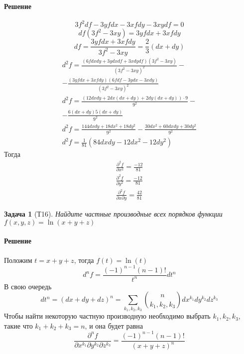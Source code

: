 \documentclass[a4paper,12pt]{report}
\newtheorem{problem}{Задача}[]
\newenvironment{sol}{\paragraph{Решение}}{}
\begin{document}
    \begin{sol}
        \begin{equation*}
            3f^2df-3yfdx-3xfdy-3xydf=0
        \end{equation*}
        \begin{equation*}
            df(3f^2-3xy)=3yfdx+3xfdy
        \end{equation*}
        \begin{equation*}
            df=\frac{3yfdx+3xfdy}{3f^2-3xy}=\frac{2}{3}(dx+dy)
        \end{equation*}
        \begin{eqnarray*}
            d^2f=\frac{(6fdxdy+3ydxdf+3xdydf)(3f^2-3xy)}{(3f^2-3xy)^2}-\\-\frac{(3yfdx+3xfdy)(6fdf-3ydx-3xdy)}{(3f^2-3xy)^2}\\ 
            d^2f=\frac{(12dxdy+2dx(dx+dy)+2dy(dx+dy))\cdot9}{9^2}-\\ 
            -\frac{6(dx+dy){5(dx+dy)}}{9^2}\\ 
            d^2f=\frac{144dxdy+18dx^2+18dy^2}{9^2}-\frac{30dx^2+60dxdy+30dy^2}{9^2}\\ 
            d^2f=\frac{1}{81}(84dxdy-12dx^2-12dy^2)
        \end{eqnarray*}
        Тогда
        \begin{eqnarray}
            \frac{\partial^2f}{\partial x^2}=\frac{-12}{81}\\ 
            \frac{\partial^2f}{\partial y^2}=\frac{-12}{81}\\ 
            \frac{\partial^2f}{\partial x\partial y}=\frac{42}{81}
        \end{eqnarray}
    \end{sol}


    \begin{problem}[Т16]
        Найдите частные производные всех порядков функции $f(x,y,z)=\ln{(x+y+z)}$
    \end{problem}
    \begin{sol}
        Положим $t=x+y+z$, тогда $f(t)=\ln(t)$
        \begin{equation}
            d^nf=\frac{(-1)^{n-1}(n-1)!}{t^n}dt^n
        \end{equation}
        В свою очередь 
        \begin{equation}
            dt^n=(dx+dy+dz)^n=\displaystyle\sum_{k_1,k_2,k_3}^{}{n\choose k_1,k_2,k_3}dx^{k_1}dy^{k_2}dz^{k_3}
        \end{equation}
        Чтобы найти некоторую частную производную необходимо выбрать $k_1,k_2,k_3$, такие что $k_1+k_2+k_3=n$, и она будет равна
        \begin{equation}
            \frac{\partial^n f}{\partial x^{k_1}\partial y^{k_2}\partial z^{k_3}}=\frac{(-1)^{n-1}(n-1)!}{(x+y+z)^n}
        \end{equation}
    \end{sol}
    
\end{document}
